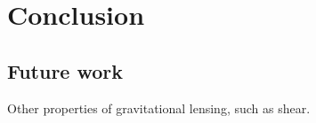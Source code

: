 \chapter{Conclusion}
\label{chapter:conclusion}

\section{Future work}

Other properties of gravitational lensing, such as shear.